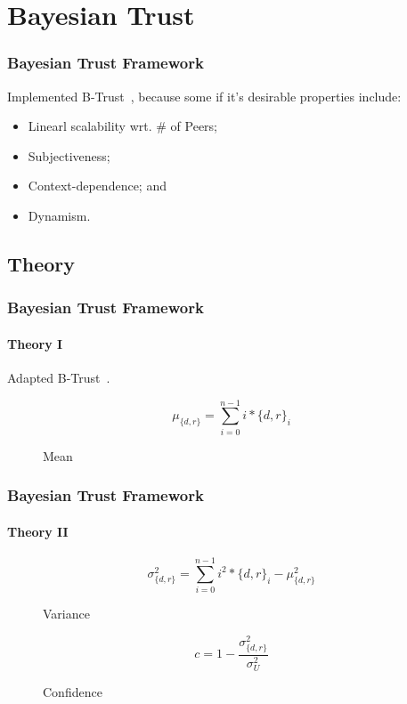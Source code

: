 \section{Bayesian Trust}
\begin{frame}
\frametitle{Bayesian Trust Framework}

Implemented B-Trust~\citep*{btrust}, because some if it's desirable properties
include:
\begin{itemize}
  \item Linearl scalability wrt. \# of Peers;
  \item Subjectiveness;
  \item Context-dependence; and
  \item Dynamism.
\end{itemize}

\end{frame}


\subsection{Theory}
\begin{frame}
\frametitle{Bayesian Trust Framework}
\framesubtitle{Theory I}

Adapted B-Trust~\citep*{btrust}.

\begin{figure}
\begin{equation}
\mu_{\{d,r\}} = \sum_{i=0}^{n-1}{i*{\{d,r\}}_i}
\end{equation}
\caption{Mean}
\end{figure}

\end{frame}


\begin{frame}
\frametitle{Bayesian Trust Framework}
\framesubtitle{Theory II}

\begin{figure}
\begin{equation}
\sigma^2_{\{d,r\}} = \sum_{i=0}^{n-1}{i^2*{\{d,r\}}_i} - \mu^2_{\{d,r\}}
\end{equation}
\caption{Variance}
\end{figure}

\begin{figure}
\begin{equation}
c = 1 - \frac{\sigma^2_{\{d,r\}}}{\sigma^2_U}
\end{equation}
\caption{Confidence}
\end{figure}

\end{frame}


